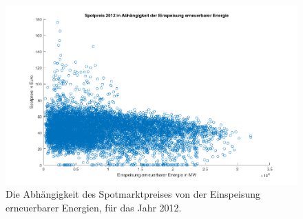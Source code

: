 \documentclass[a4paper,12pt]{article}
\begin{document}
	\begin{figure}[H]
		\centering
		\includegraphics[width=12cm]{img/results/ScatterEinspeisung}
		\caption{Die Abhängigkeit des Spotmarktpreises von der Einspeisung erneuerbarer Energien, für das Jahr 2012.}
	\end{figure}
\end{document}
